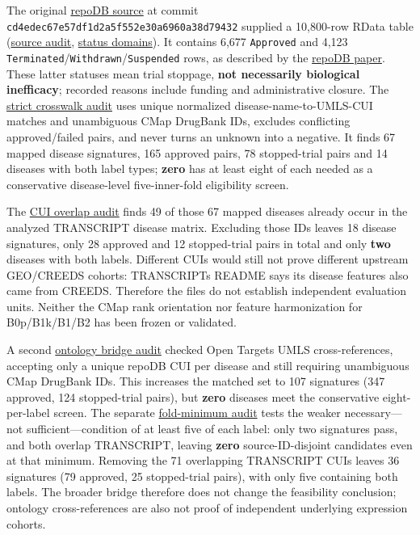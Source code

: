 \documentclass[
  10pt,
]{ctexart}
\begin{document}
The original \href{https://github.com/adam-sam-brown/repoDB}{repoDB
source} at commit \texttt{cd4edec67e57df\allowbreak{}1d2a5f552e30a6\allowbreak{}960a38d79432}
supplied a 10,800-row RData table
(\href{../benchmark/results/external_repodb_2017_source_audit.json}{source
audit},
\href{../benchmark/results/external_repodb_2017_domains.json}{status
domains}). It contains 6,677 \texttt{Approved} and 4,123
\texttt{Terminated}/\texttt{Withdrawn}/\texttt{Suspended} rows, as
described by the
\href{https://www.nature.com/articles/sdata201729}{repoDB paper}. These
latter statuses mean trial stoppage, \textbf{not necessarily biological
inefficacy}; recorded reasons include funding and administrative
closure. The
\href{../benchmark/results/external_repodb_exact_crosswalk_audit.json}{strict
crosswalk audit} uses unique normalized disease-name-to-UMLS-CUI matches
and unambiguous CMap DrugBank IDs, excludes conflicting approved/failed
pairs, and never turns an unknown into a negative. It finds 67 mapped
disease signatures, 165 approved pairs, 78 stopped-trial pairs and 14
diseases with both label types; \textbf{zero} has at least eight of each
needed as a conservative disease-level five-inner-fold eligibility
screen.

The
\href{../benchmark/results/external_repodb_independence_audit.json}{CUI
overlap audit} finds 49 of those 67 mapped diseases already occur in the
analyzed TRANSCRIPT disease matrix. Excluding those IDs leaves 18
disease signatures, only 28 approved and 12 stopped-trial pairs in total
and only \textbf{two} diseases with both labels. Different CUIs would
still not prove different upstream GEO/CREEDS cohorts:
TRANSCRIPT\textquotesingle s README says its disease features also came
from CREEDS. Therefore the files do not establish independent evaluation
units. Neither the CMap rank orientation nor feature harmonization for
B0p/B1k/B1/B2 has been frozen or validated.

A second
\href{../benchmark/results/external_repodb_ontology_bridge_audit.json}{ontology
bridge audit} checked Open Targets UMLS cross-references, accepting only
a unique repoDB CUI per disease and still requiring unambiguous CMap
DrugBank IDs. This increases the matched set to 107 signatures (347
approved, 124 stopped-trial pairs), but \textbf{zero} diseases meet the
conservative eight-per-label screen. The separate
\href{../benchmark/results/external_repodb_fold_minimum_audit.json}{fold-minimum
audit} tests the weaker necessary---not sufficient---condition of at
least five of each label: only two signatures pass, and both overlap
TRANSCRIPT, leaving \textbf{zero} source-ID-disjoint candidates even at
that minimum. Removing the 71 overlapping TRANSCRIPT CUIs leaves 36
signatures (79 approved, 25 stopped-trial pairs), with only five
containing both labels. The broader bridge therefore does not change the
feasibility conclusion; ontology cross-references are also not proof of
independent underlying expression cohorts.
\end{document}
